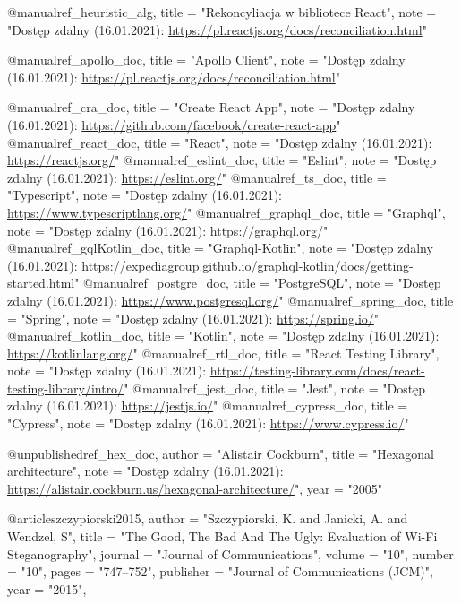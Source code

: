 @manual{ref_heuristic_alg,
    title        = "Rekoncyliacja w bibliotece React",
    note  = "Dostęp zdalny (16.01.2021): \url{https://pl.reactjs.org/docs/reconciliation.html}"
}

@manual{ref_apollo_doc,
    title = "Apollo Client",
    note  = "Dostęp zdalny (16.01.2021): \url{https://pl.reactjs.org/docs/reconciliation.html}"
}

@manual{ref_cra_doc,
    title = "Create React App",
    note  = "Dostęp zdalny (16.01.2021): \url{https://github.com/facebook/create-react-app}"
}
@manual{ref_react_doc,
    title = "React",
    note  = "Dostęp zdalny (16.01.2021): \url{https://reactjs.org/}"
}
@manual{ref_eslint_doc,
    title = "Eslint",
    note  = "Dostęp zdalny (16.01.2021): \url{https://eslint.org/}"
}
@manual{ref_ts_doc,
    title = "Typescript",
    note  = "Dostęp zdalny (16.01.2021): \url{https://www.typescriptlang.org/}"
}
@manual{ref_graphql_doc,
    title = "Graphql",
    note  = "Dostęp zdalny (16.01.2021): \url{https://graphql.org/}"
}
@manual{ref_gqlKotlin_doc,
    title = "Graphql-Kotlin",
    note  = "Dostęp zdalny (16.01.2021): \url{https://expediagroup.github.io/graphql-kotlin/docs/getting-started.html}"
}
@manual{ref_postgre_doc,
    title = "PostgreSQL",
    note  = "Dostęp zdalny (16.01.2021): \url{https://www.postgresql.org/}"
}
@manual{ref_spring_doc,
    title = "Spring",
    note  = "Dostęp zdalny (16.01.2021): \url{https://spring.io/}"
}
@manual{ref_kotlin_doc,
    title = "Kotlin",
    note  = "Dostęp zdalny (16.01.2021): \url{https://kotlinlang.org/}"
}
@manual{ref_rtl_doc,
    title = "React Testing Library",
    note  = "Dostęp zdalny (16.01.2021): \url{https://testing-library.com/docs/react-testing-library/intro/}"
}
@manual{ref_jest_doc,
    title = "Jest",
    note  = "Dostęp zdalny (16.01.2021): \url{https://jestjs.io/}"
}
@manual{ref_cypress_doc,
    title = "Cypress",
    note  = "Dostęp zdalny (16.01.2021): \url{https://www.cypress.io/}"
}

@unpublished{ref_hex_doc,
    author = "Alistair Cockburn",
    title  = "Hexagonal architecture",
    note   = "Dostęp zdalny (16.01.2021): \url{https://alistair.cockburn.us/hexagonal-architecture/}",
    year   = "2005"
}

@article{szczypiorski2015,
    author    = "Szczypiorski, K. and Janicki, A. and Wendzel, S",
    title     = "{T}he {G}ood, {T}he {B}ad {A}nd {T}he {U}gly: {E}valuation of {W}i-{F}i {S}teganography",
    journal   = "Journal of Communications",
    volume    = "10",
    number    = "10",
    pages     = "747--752",
    publisher = "Journal of Communications (JCM)",
    year      = "2015",
}

